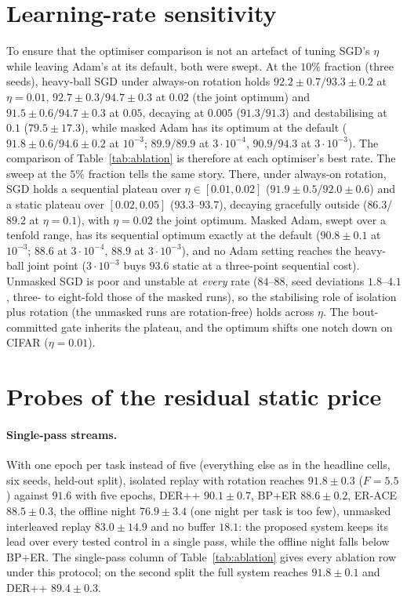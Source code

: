 \documentclass{article}
\begin{document}
\section{Learning-rate sensitivity}
\label{app:eta}

To ensure that the optimiser comparison is not an artefact of tuning SGD's $\eta$ while
leaving Adam's at its default, both were swept. At the $10\%$ fraction (three seeds),
heavy-ball SGD under always-on rotation holds $92.2\pm0.7/93.3\pm0.2$ at $\eta{=}0.01$,
$92.7\pm0.3/94.7\pm0.3$ at $0.02$ (the joint optimum) and $91.5\pm0.6/94.7\pm0.3$ at $0.05$,
decaying at $0.005$ ($91.3/91.3$) and destabilising at $0.1$ ($79.5\pm17.3$), while masked
Adam has its optimum at the default ($91.8\pm0.6/94.6\pm0.2$ at $10^{-3}$; $89.9/89.9$ at
$3{\cdot}10^{-4}$, $90.9/94.3$ at $3{\cdot}10^{-3}$). The comparison of
Table~\ref{tab:ablation} is therefore at each optimiser's best rate. The sweep at the $5\%$
fraction tells the same story. There, under always-on rotation, SGD holds a sequential
plateau over $\eta\in[0.01,0.02]$ ($91.9\pm0.5$/$92.0\pm0.6$) and a static plateau over
$[0.02,0.05]$ ($93.3$--$93.7$), decaying gracefully outside ($86.3$/$89.2$ at $\eta{=}0.1$),
with $\eta{=}0.02$ the joint optimum. Masked Adam, swept over a tenfold range, has its
sequential optimum exactly at the default ($90.8\pm0.1$ at $10^{-3}$; $88.6$ at
$3{\cdot}10^{-4}$, $88.9$ at $3{\cdot}10^{-3}$), and no Adam setting reaches the heavy-ball
joint point ($3{\cdot}10^{-3}$ buys $93.6$ static at a three-point sequential cost).
Unmasked SGD is poor and unstable at \emph{every} rate ($84$--$88$, seed deviations
$1.8$--$4.1$, three- to eight-fold those of the masked runs), so the stabilising role of
isolation plus rotation (the unmasked runs are rotation-free) holds across $\eta$. The
bout-committed gate inherits the plateau, and the optimum shifts one notch down on CIFAR
($\eta{=}0.01$).


\section{Probes of the residual static price}
\label{app:probes}

\paragraph{Single-pass streams.} With one epoch per task instead of five (everything else
as in the headline cells, six seeds, held-out split), isolated replay with rotation reaches
$91.8\pm0.3$ ($F{=}5.5$) against $91.6$ with five epochs, DER++ $90.1\pm0.7$, BP+ER
$88.6\pm0.2$, ER-ACE $88.5\pm0.3$, the offline night $76.9\pm3.4$ (one night per task is too
few), unmasked interleaved replay $83.0\pm14.9$ and no buffer $18.1$: the proposed system
keeps its lead over every tested control in a single pass, while the offline night falls
below BP+ER. The single-pass column of Table~\ref{tab:ablation} gives every ablation row
under this protocol; on the second split the full system reaches $91.8\pm0.1$ and DER++
$89.4\pm0.3$.
\end{document}
